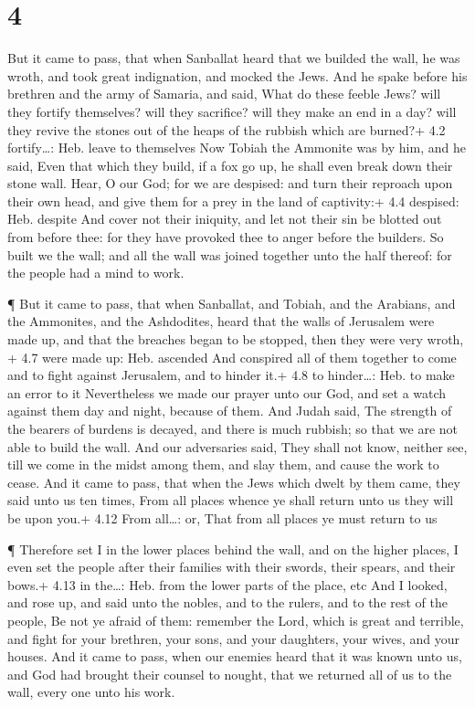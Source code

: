 \hypertarget{section-3}{%
\section{4}\label{section-3}}

 But it came to pass, that when Sanballat heard that we
builded the wall, he was wroth, and took great indignation, and mocked
the Jews.  And he spake before his brethren and the army of
Samaria, and said, What do these feeble Jews? will they fortify
themselves? will they sacrifice? will they make an end in a day? will
they revive the stones out of the heaps of the rubbish which are
burned?+ 4.2 fortify\ldots: Heb. leave to themselves  Now
Tobiah the Ammonite was by him, and he said, Even that which they build,
if a fox go up, he shall even break down their stone wall. 
Hear, O our God; for we are despised: and turn their reproach upon their
own head, and give them for a prey in the land of captivity:+ 4.4
despised: Heb. despite  And cover not their iniquity, and
let not their sin be blotted out from before thee: for they have
provoked thee to anger before the builders.  So built we the
wall; and all the wall was joined together unto the half thereof: for
the people had a mind to work.

 ¶ But it came to pass, that when Sanballat, and Tobiah, and
the Arabians, and the Ammonites, and the Ashdodites, heard that the
walls of Jerusalem were made up, and that the breaches began to be
stopped, then they were very wroth, + 4.7 were made up: Heb. ascended
 And conspired all of them together to come and to fight
against Jerusalem, and to hinder it.+ 4.8 to hinder\ldots: Heb. to make
an error to it  Nevertheless we made our prayer unto our
God, and set a watch against them day and night, because of them.
 And Judah said, The strength of the bearers of burdens is
decayed, and there is much rubbish; so that we are not able to build the
wall.  And our adversaries said, They shall not know,
neither see, till we come in the midst among them, and slay them, and
cause the work to cease.  And it came to pass, that when
the Jews which dwelt by them came, they said unto us ten times, From all
places whence ye shall return unto us they will be upon you.+ 4.12 From
all\ldots: or, That from all places ye must return to us

 ¶ Therefore set I in the lower places behind the wall, and
on the higher places, I even set the people after their families with
their swords, their spears, and their bows.+ 4.13 in the\ldots: Heb.
from the lower parts of the place, etc  And I looked, and
rose up, and said unto the nobles, and to the rulers, and to the rest of
the people, Be not ye afraid of them: remember the Lord, which is great
and terrible, and fight for your brethren, your sons, and your
daughters, your wives, and your houses.  And it came to
pass, when our enemies heard that it was known unto us, and God had
brought their counsel to nought, that we returned all of us to the wall,
every one unto his work.

